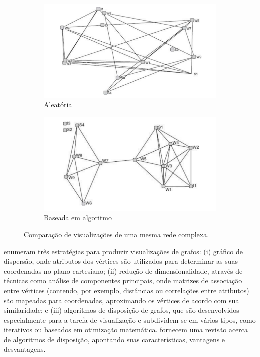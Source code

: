 \begin{figure}[ht]
    \centering
    \begin{subfigure}{0.49\textwidth}
        \includegraphics[width=\linewidth]{imagens/randomlayout.png}
        \caption{Aleatória} \label{fig:viza}
    \end{subfigure}
    \vspace*{0.35cm}
    \begin{subfigure}{0.49\textwidth}
        \includegraphics[width=\linewidth]{imagens/goodlayout2.png}
        \caption{Baseada em algoritmo} \label{fig:vizb}
    \end{subfigure}
    \vspace*{0.3cm}
    \caption{Comparação de visualizações de uma mesma rede complexa.}
    \label{fig:vizcomparison}
\end{figure}

 enumeram três estratégias para produzir visualizações de grafos: (i) gráfico de dispersão, onde atributos dos vértices são utilizados para determinar as suas coordenadas no plano cartesiano; (ii) redução de dimensionalidade, através de técnicas como análise de componentes principais, onde matrizes de associação entre vértices (contendo, por exemplo, distâncias ou correlações entre atributos) são mapeadas para coordenadas, aproximando os vértices de acordo com sua similaridade; e (iii) algoritmos de disposição de grafos, que são desenvolvidos especialmente para a tarefa de visualização e subdividem-se em vários tipos, como iterativos ou baseados em otimização matemática.  fornecem uma revisão acerca de algoritmos de disposição, apontando suas características, vantagens e desvantagens.

